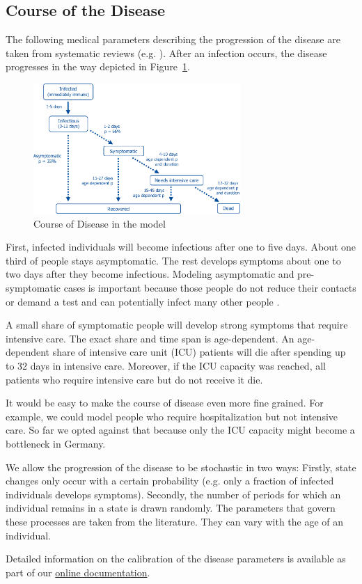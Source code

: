 \subsection{Course of the Disease}
\label{sub:course_of_disease}

The following medical parameters describing the progression of the disease are taken from systematic reviews (e.g. \cite{He2020}). After an infection occurs, the disease progresses in the way depicted in Figure~\ref{fig:course_of_disease}.

\begin{figure}[!ht]
    \includegraphics[width=0.7\textwidth]{../figures/disease_progression.png}
    \caption{Course of Disease in the model}
    \label{fig:course_of_disease}
\end{figure}

First, infected individuals will become infectious after one to five days. About one third of people stays asymptomatic. The rest develops symptoms about one to two days after they become infectious. Modeling asymptomatic and pre-symptomatic cases is important because those people do not reduce their contacts or demand a test and can potentially infect many other people \citep{Donsimoni2020}.

A small share of symptomatic people will develop strong symptoms that require intensive care. The exact share and time span is age-dependent. An age-dependent share of intensive care unit (ICU) patients will die after spending up to 32 days in intensive care. Moreover, if the ICU capacity was reached, all patients who require intensive care but do not receive it die.

It would be easy to make the course of disease even more fine grained. For example, we could model people who require hospitalization but not intensive care. So far we opted against that because only the ICU capacity might become a bottleneck in Germany.

We allow the progression of the disease to be stochastic in two ways: Firstly, state changes only occur with a certain probability (e.g. only a fraction of infected individuals develops symptoms). Secondly, the number of periods for which an individual remains in a state is drawn randomly. The parameters that govern these processes are taken from the literature. They can vary with the age of an individual.

Detailed information on the calibration of the disease parameters is available as part of our \href{https://sid-dev.readthedocs.io/en/latest/reference_guides/epi_params.html}{online documentation}.
